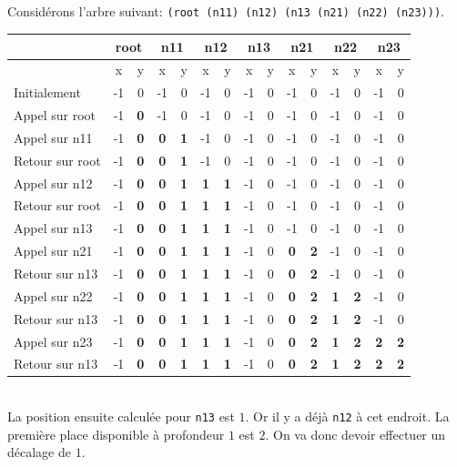 \subparagraph{} Considérons l'arbre suivant: \verb|(root (n11) (n12) (n13 (n21) (n22) (n23)))|. \\
\begin{tabular}{|l|c|c|c|c|c|c|c|c|c|c|c|c|c|c|}
	\hline
	 & \multicolumn{2}{|c|}{root} & \multicolumn{2}{|c|}{n11} & \multicolumn{2}{|c|}{n12} & \multicolumn{2}{|c|}{n13} & \multicolumn{2}{|c|}{n21} & \multicolumn{2}{|c|}{n22} & \multicolumn{2}{|c|}{n23}\\ \hline
	& x & y & x & y & x & y & x & y & x & y & x & y & x & y \\ \hline
	Initialement & -1 & 0 & -1 & 0 & -1 & 0 & -1 & 0 & -1 & 0 & -1 & 0 & -1 & 0 \\ \hline
	Appel sur root & -1 & \textbf{0} & -1 & 0 & -1 & 0 & -1 & 0 & -1 & 0 & -1 & 0 & -1 & 0 \\ \hline
	Appel sur n11 & -1 & \textbf{0} & \textbf{0} & \textbf{1} & -1 & 0 & -1 & 0 & -1 & 0 & -1 & 0 & -1 & 0 \\ \hline
	Retour sur root & -1 & \textbf{0} & \textbf{0} & \textbf{1} & -1 & 0 & -1 & 0 & -1 & 0 & -1 & 0 & -1 & 0 \\ \hline
	Appel sur n12 & -1 & \textbf{0} & \textbf{0} & \textbf{1} & \textbf{1} & \textbf{1} & -1 & 0 & -1 & 0 & -1 & 0 & -1 & 0 \\ \hline
	Retour sur root & -1 & \textbf{0} & \textbf{0} & \textbf{1} & \textbf{1} & \textbf{1} & -1 & 0 & -1 & 0 & -1 & 0 & -1 & 0 \\ \hline
	Appel sur n13 & -1 & \textbf{0} & \textbf{0} & \textbf{1} & \textbf{1} & \textbf{1} & -1 & 0 & -1 & 0 & -1 & 0 & -1 & 0 \\ \hline
	Appel sur n21 & -1 & \textbf{0} & \textbf{0} & \textbf{1} & \textbf{1} & \textbf{1} & -1 & 0 & \textbf{0} & \textbf{2} & -1 & 0 & -1 & 0 \\ \hline
	Retour sur n13 & -1 & \textbf{0} & \textbf{0} & \textbf{1} & \textbf{1} & \textbf{1} & -1 & 0 & \textbf{0} & \textbf{2} & -1 & 0 & -1 & 0 \\ \hline
	Appel sur n22 & -1 & \textbf{0} & \textbf{0} & \textbf{1} & \textbf{1} & \textbf{1} & -1 & 0 & \textbf{0} & \textbf{2} & \textbf{1} & \textbf{2} & -1 & 0 \\ \hline
	Retour sur n13 & -1 & \textbf{0} & \textbf{0} & \textbf{1} & \textbf{1} & \textbf{1} & -1 & 0 & \textbf{0} & \textbf{2} & \textbf{1} & \textbf{2} & -1 & 0 \\ \hline
	Appel sur n23 & -1 & \textbf{0} & \textbf{0} & \textbf{1} & \textbf{1} & \textbf{1} & -1 & 0 & \textbf{0} & \textbf{2} & \textbf{1} & \textbf{2} & \textbf{2} & \textbf{2} \\ \hline
	Retour sur n13 & -1 & \textbf{0} & \textbf{0} & \textbf{1} & \textbf{1} & \textbf{1} & -1 & 0 & \textbf{0} & \textbf{2} & \textbf{1} & \textbf{2} & \textbf{2} & \textbf{2} \\ \hline
\end{tabular}\\
La position ensuite calculée pour \verb|n13| est $1$. Or il y a déjà \verb|n12| à cet endroit. La première place disponible à profondeur $1$ est $2$. On va donc devoir effectuer un décalage de $1$.

